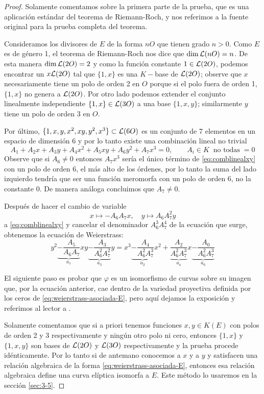 \begin{proof}
	Solamente comentamos sobre la primera parte de la prueba, que es una aplicación estándar del teorema de Riemann-Roch, y nos referimos a la fuente original \cite[III.3.1]{SilvermanTAOEC} para la prueba completa del teorema.
	
	Consideramos los divisores de $E$ de la forma $nO$ que tienen grado $n>0$. Como $E$ es de género 1, el teorema de Riemann-Roch nos dice que $\dim\mathcal{L}(nO)=n$. De esta manera $\dim\mathcal{L}(2O)=2$ y como la función constante $1\in\mathcal{L}(2O)$, podemos encontrar un $x\mathcal{L}(2O)$ tal que $\{1,x\}$ es una $K-$base de $\mathcal{L}(2O)$; observe que $x$ necesariamente tiene un polo de orden 2 en $O$ porque si el polo fuera de orden 1, $\{1,x\}$ no genera a $\mathcal{L}(2O)$. Por otro lado podemos extender el conjunto linealmente independiente $\{1,x\}\in\mathcal{L}(3O)$ a una base $\{1,x,y\}$; similarmente $y$ tiene un polo de orden 3 en $O$.
	
	Por último, $\{1,x,y,x^2,xy,y^2,x^3\}\subset\mathcal{L}(6O)$ es un conjunto de 7 elementos en un espacio de dimensión 6 y por lo tanto existe una combinación lineal no trivial
\begin{equation}\label{eq:comblinealxy}
	A_1+A_2x+A_3y+A_4x^2+A_5xy+A_6y^2+A_7x^3=0,\qquad A_i\in K\;\;\text{no todas}\;=0
\end{equation}
Observe que si $A_6\neq0$ entonces $A_7 x^3$ sería el único término de \eqref{eq:comblinealxy} con un polo de orden 6, el más alto de los órdenes, por lo tanto la suma del lado izquierdo tendría que ser una función meromorfa con un polo de orden 6, no la constante 0. De manera análoga concluimos que $A_7\neq0$.

Después de hacer el cambio de variable
\begin{equation}\label{eq:cambio-variable-weierstrass-general}
	x\mapsto -A_6A_7x,\quad y\mapsto A_6A_7^2y
\end{equation}
a \eqref{eq:comblinealxy} y cancelar el denominador $A_6^3A_7^4$ de la ecuación que surge, obtenemos la ecuación de Weierstrass:
\[
	y^2\underset{a_1}{\underbrace{-\frac{A_5}{A_6A_7}}}xy
	\underset{a_3}{\underbrace{-\frac{A_3}{A_6^2A_7^2}}}y
	=x^3
	\underset{a_2}{\underbrace{-\frac{A_4}{A_6^2A_7^3}}}x^2
	+\underset{a_4}{\underbrace{\frac{A_2}{A_6^2A_7^3}}}x
	\underset{a_6}{\underbrace{-\frac{A_0}{A_6^2A_7^3}}}
\]

El siguiente paso es probar que $\varphi$ es un isomorfismo de curvas sobre su imagen que, por la ecuación anterior, cae dentro de la variedad proyectiva definida por los ceros de \eqref{eq:weierstrass-asociada-E}, pero aquí dejamos la exposición y referimos al lector a \cite{SilvermanTAOEC}.

Solamente comentamos que si a priori tenemos funciones $x,y\in K(E)$ con polos de orden 2 y 3 respectivamente y ningún otro polo ni cero, entonces $\{1,x\}$ y $\{1,x,y\}$ son bases de $\mathcal{L}(2O)$ y $\mathcal{L}(3O)$ respectivamente y la prueba procede idénticamente. Por lo tanto si de antemano conocemos a $x$ y a $y$ y satisfacen una relación algebraica de la forma \eqref{eq:weierstrass-asociada-E}, entonces esa relación algebraica define una curva elíptica isomorfa a $E$. Este método lo usaremos en la sección \ref{sec:3-5}.
\end{proof}

